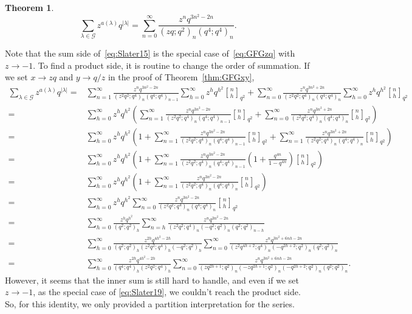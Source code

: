 \documentclass[12pt]{amsart}
\newtheorem{theorem}{Theorem}[section]
\theoremstyle{definition}
\theoremstyle{remark}
\numberwithin{equation}{section}
\begin{document}
\begin{theorem}
\begin{equation}\label{eq:GFGzq}
\sum_{\lambda\in\mathcal{G}}z^{a(\lambda)}q^{|\lambda|}=\sum_{n=0}^{\infty}\frac{z^{n}q^{3n^2-2n}}{(zq;q^2)_n(q^4;q^4)_{n}}.   
\end{equation}
\end{theorem}
Note that the sum side of~\eqref{eq:Slater15} is the special case of~\eqref{eq:GFGzq} with $z\to-1$. To find a product side, it is routine to change the order of summation. If we set $x\to zq$ and $y\to q/z$ in the proof of Theorem~\ref{thm:GFGxy},
\begin{align*}
\sum_{\lambda\in\mathcal{G}}z^{a(\lambda)}q^{|\lambda|}=&\sum_{n=1}^{\infty}\frac{z^{n}q^{3n^2-2n}}{(z^2q^2;q^4)_n(q^4;q^4)_{n-1}}\sum_{h=0}^{\infty}z^{h}q^{h^2}{n \brack h}_{q^2}+\sum_{n=0}^{\infty}\frac{z^{n}q^{3n^2+2n}}{(z^2q^2;q^4)_n(q^4;q^4)_n}\sum_{h=0}^{\infty}z^{h}q^{h^2}{n \brack h}_{q^2}\\
=&\sum_{h=0}^{\infty}z^{h}q^{h^2}\left(\sum_{n=1}^{\infty}\frac{z^{n}q^{3n^2-2n}}{(z^2q^2;q^4)_n(q^4;q^4)_{n-1}}{n \brack h}_{q^2}+\sum_{n=0}^{\infty}\frac{z^{n}q^{3n^2+2n}}{(z^2q^2;q^4)_n(q^4;q^4)_n}{n \brack h}_{q^2}\right)\\
=&\sum_{h=0}^{\infty}z^{h}q^{h^2}\left(1+\sum_{n=1}^{\infty}\frac{z^{n}q^{3n^2-2n}}{(z^2q^2;q^4)_n(q^4;q^4)_{n-1}}{n \brack h}_{q^2}+\sum_{n=1}^{\infty}\frac{z^{n}q^{3n^2+2n}}{(z^2q^2;q^4)_n(q^4;q^4)_n}{n \brack h}_{q^2}\right)\\
=&\sum_{h=0}^{\infty}z^{h}q^{h^2}\left(1+\sum_{n=1}^{\infty}\frac{z^{n}q^{3n^2-2n}}{(z^2q^2;q^4)_n(q^4;q^4)_{n-1}}\left(1+\frac{q^{4n}}{1-q^{4n}}\right){n \brack h}_{q^2}\right)\\
=&\sum_{h=0}^{\infty}z^{h}q^{h^2}\left(1+\sum_{n=1}^{\infty}\frac{z^{n}q^{3n^2-2n}}{(z^2q^2;q^4)_n(q^4;q^4)_{n}}{n \brack h}_{q^2}\right)\\
=&\sum_{h=0}^{\infty}z^{h}q^{h^2}\sum_{n=0}^{\infty}\frac{z^{n}q^{3n^2-2n}}{(z^2q^2;q^4)_n(q^4;q^4)_{n}}{n \brack h}_{q^2}\\
=&\sum_{h=0}^{\infty}\frac{z^{h}q^{h^2}}{(q^2;q^2)_h}\sum_{n=h}^{\infty}\frac{z^{n}q^{3n^2-2n}}{(z^2q^2;q^4)_n(-q^2;q^2)_{n}(q^2;q^2)_{n-h}}\\
=&\sum_{h=0}^{\infty}\frac{z^{2h}q^{4h^2-2h}}{(q^2;q^2)_h(z^2q^2;q^4)_h(-q^2;q^2)_h}\sum_{n=0}^{\infty}\frac{z^{n}q^{3n^2+6nh-2n}}{(z^2q^{4h+2};q^4)_n(-q^{2h+2};q^2)_{n}(q^2;q^2)_{n}}\\
=&\sum_{h=0}^{\infty}\frac{z^{2h}q^{4h^2-2h}}{(q^4;q^4)_h(z^2q^2;q^4)_h}\sum_{n=0}^{\infty}\frac{z^{n}q^{3n^2+6nh-2n}}{(zq^{2h+1};q^2)_n(-zq^{2h+1};q^2)_{n}(-q^{2h+2};q^2)_{n}(q^2;q^2)_{n}}.
\end{align*}
However, it seems that the inner sum is still hard to handle, and even if we set $z\to-1$, as the special case of \eqref{eq:Slater19}, we couldn't reach the product side. So, for this identity, we only provided a partition interpretation for the series.
\end{document}
